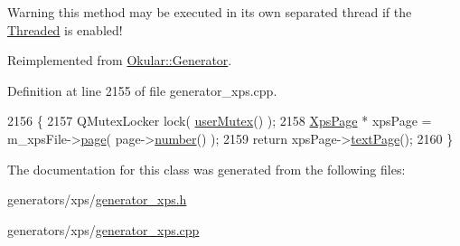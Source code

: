 \begin{DoxyWarning}{Warning}
this method may be executed in its own separated thread if the \hyperlink{classOkular_1_1Generator_a8517096896273a5ba5b970be09313c77a0764a910b194896e72da084c3c51a2d0}{Threaded} is enabled! 
\end{DoxyWarning}


Reimplemented from \hyperlink{classOkular_1_1Generator_af7915b97ab4b9347fb76babdda212cef}{Okular\+::\+Generator}.



Definition at line 2155 of file generator\+\_\+xps.\+cpp.


\begin{DoxyCode}
2156 \{
2157     QMutexLocker lock( \hyperlink{classOkular_1_1Generator_a83d702cccbce2288c3258d97f1f15e19}{userMutex}() );
2158     \hyperlink{classXpsPage}{XpsPage} * xpsPage = m\_xpsFile->\hyperlink{classXpsFile_aabe5c767300a2c84a6b791ef8333007b}{page}( page->\hyperlink{classOkular_1_1Page_a6eee5f157a130b47d81ddd63e501664b}{number}() );
2159     \textcolor{keywordflow}{return} xpsPage->\hyperlink{classXpsPage_a6aee6a94650e230c3f84cf75ae4bc55f}{textPage}();
2160 \}
\end{DoxyCode}


The documentation for this class was generated from the following files\+:\begin{DoxyCompactItemize}
\item 
generators/xps/\hyperlink{generator__xps_8h}{generator\+\_\+xps.\+h}\item 
generators/xps/\hyperlink{generator__xps_8cpp}{generator\+\_\+xps.\+cpp}\end{DoxyCompactItemize}
